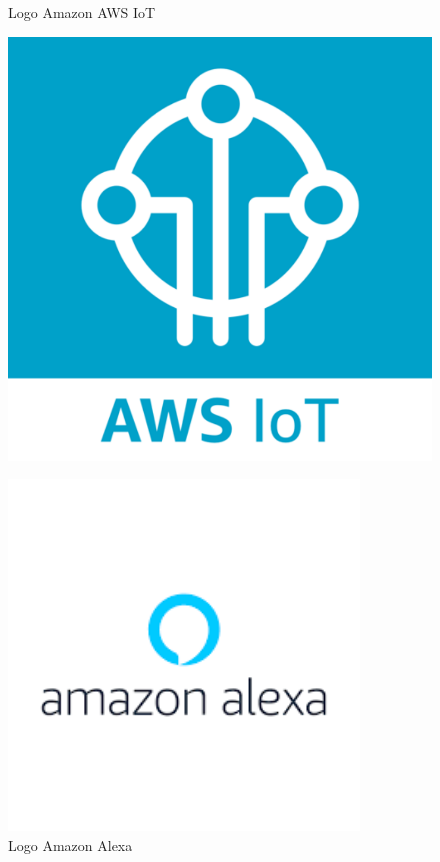 \documentclass[
    12pt,
    openright,
    twoside,
    a4paper,
    english,
    spanish,
    brazil,
    ]{abntex2}
\begin{document}
\begin{figure}[htb]
\begin{minipage}{0.4\textwidth}
		\centering
		\caption{Logo Amazon AWS IoT} \label{fig_logo_aws_iot}
		\includegraphics[scale=0.2]{Images/logo_aws_iot.pdf}
	\end{minipage}
	\hfill
	\begin{minipage}{0.4\textwidth}
		\centering
		\caption{Logo Amazon Alexa} \label{fig_logo_amazon_alexa}
		\includegraphics[scale=0.7]{Images/logo_amazon_alexa.pdf}
	\end{minipage}
\end{figure}
\end{document}
